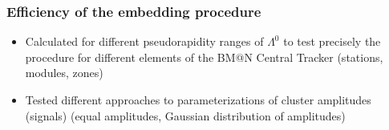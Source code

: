 \documentclass[dvipsnames] {beamer}
\begin{document}

       \begin{frame}
         \bf
         \frametitle{\bf \centering Efficiency of the embedding procedure}
         \begin{block}{}
           \begin{itemize}
           \item Calculated for different pseudorapidity ranges of $\Lambda^{0}$ to test precisely the procedure
             for different elements of the BM@N Central Tracker (stations, modules, zones)
           \item Tested different approaches to parameterizations of cluster amplitudes (signals)
             (equal amplitudes, Gaussian distribution of amplitudes)
         \end{itemize}
         \end{block}
       \end{frame}

     
\end{document}
